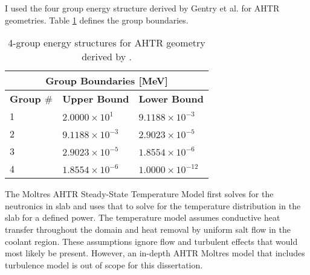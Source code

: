 I used the four group energy structure derived by Gentry et al. 
\cite{gentry_development_2016} for \gls{AHTR} geometries. 
Table \ref{tab:energy_structures} defines the group boundaries. 
\begin{table}[H]
    \centering
    \onehalfspacing
    \caption{4-group energy structures for \acrfull{AHTR} geometry 
    derived by \cite{gentry_development_2016}.}
	\label{tab:energy_structures}
    \footnotesize
    \begin{tabular}{lll}
    \hline
    \multicolumn{3}{c}{\textbf{Group Boundaries [MeV]}} \\ 
    \hline
    \textbf{Group $\#$}& \textbf{Upper Bound} & \textbf{Lower Bound}  \\
    \hline 
    1 & $2.0000\times 10^1$ & $9.1188\times 10^{-3}$ \\ 
    2 & $9.1188\times 10^{-3}$ & $2.9023\times 10^{-5}$\\
    3 & $2.9023\times 10^{-5}$ & $1.8554\times 10^{-6}$\\
    4 & $1.8554\times 10^{-6}$ & $1.0000\times 10^{-12}$\\
    \hline
    \end{tabular}
\end{table}

The Moltres AHTR Steady-State Temperature Model first solves for the neutronics 
in slab and uses that to solve for the temperature distribution in the slab 
for a defined power. 
The temperature model assumes conductive heat transfer throughout the domain 
and heat removal by uniform salt flow in the coolant region. 
These assumptions ignore flow and turbulent effects that would most likely be 
present. 
However, an in-depth AHTR Moltres model that includes turbulence model is 
out of scope for this dissertation. 

